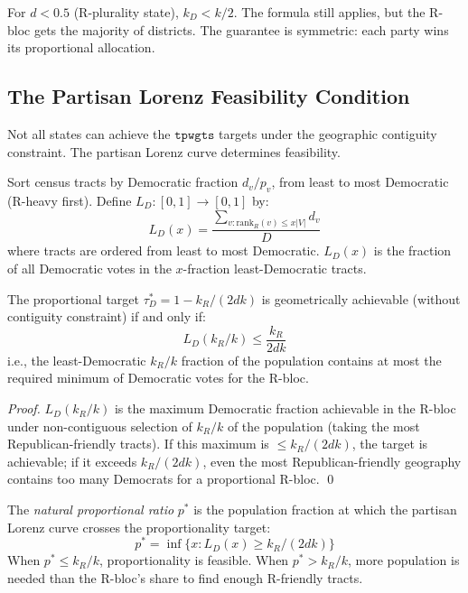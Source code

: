 \begin{remark}
For $d < 0.5$ (R-plurality state), $k_D < k/2$. The formula still applies,
but the R-bloc gets the majority of districts. The guarantee is symmetric:
each party wins its proportional allocation.
\end{remark}

\subsection{The Partisan Lorenz Feasibility Condition}

Not all states can achieve the $\mathtt{tpwgts}$ targets under the geographic
contiguity constraint. The partisan Lorenz curve determines feasibility.

\begin{definition}
\label{def:lorenz}
Sort census tracts by Democratic fraction $d_v / p_v$, from least to most
Democratic (R-heavy first). Define $L_D : [0,1] \to [0,1]$ by:
\[
  L_D(x) = \frac{\sum_{v : \mathrm{rank}_R(v) \leq x|V|} d_v}{D}
\]
where tracts are ordered from least to most Democratic.
$L_D(x)$ is the fraction of all Democratic votes in the $x$-fraction least-Democratic tracts.
\end{definition}

\begin{theorem}
\label{thm:lorenz-feasibility}
The proportional target $\tau_D^* = 1 - k_R/(2dk)$ is geometrically achievable
(without contiguity constraint) if and only if:
\[
  L_D(k_R/k) \leq \frac{k_R}{2dk}
\]
i.e., the least-Democratic $k_R/k$ fraction of the population contains at most
the required minimum of Democratic votes for the R-bloc.
\end{theorem}

\begin{proof}
$L_D(k_R/k)$ is the maximum Democratic fraction achievable in the R-bloc under
non-contiguous selection of $k_R/k$ of the population (taking the most
Republican-friendly tracts). If this maximum is $\leq k_R/(2dk)$, the target
is achievable; if it exceeds $k_R/(2dk)$, even the most Republican-friendly
geography contains too many Democrats for a proportional R-bloc. \qed
\end{proof}

\begin{definition}
The \emph{natural proportional ratio} $p^*$ is the population fraction at which
the partisan Lorenz curve crosses the proportionality target:
\[
  p^* = \inf\{x : L_D(x) \geq k_R/(2dk)\}
\]
When $p^* \leq k_R/k$, proportionality is feasible. When $p^* > k_R/k$,
more population is needed than the R-bloc's share to find enough R-friendly tracts.
\end{definition}

